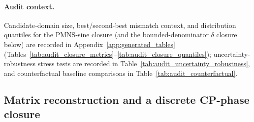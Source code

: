 \begin{table}[t]
\centering
\small
\setlength{\tabcolsep}{8pt}
\renewcommand{\arraystretch}{1.15}
%
\caption{NO/IO robustness diagnostic for the PMNS closures at $(m,n)=(6,3)$: we rerun the bounded-complexity minimizers at $B=20$ (angles) and $Q=12$ (phase) against representative normal- and inverted-ordering reference targets (PDG conventions). Rows are generated by \texttt{scripts/exp\_pmns\_no\_io\_stability.py}.}
\label{tab:pmns_no_io_stability}
\end{table}

\paragraph{Audit context.}
Candidate-domain size, best/second-best mismatch context, and distribution quantiles for the PMNS-sine closure (and the bounded-denominator $\delta$ closure below) are recorded in Appendix~\ref{app:generated_tables} (Tables~\ref{tab:audit_closure_metrics}--\ref{tab:audit_closure_quantiles}); uncertainty-robustness stress tests are recorded in Table~\ref{tab:audit_uncertainty_robustness}, and counterfactual baseline comparisons in Table~\ref{tab:audit_counterfactual}.

\subsection{Matrix reconstruction and a discrete CP-phase closure}
\label{subsec:pmns_matrix_closure}


